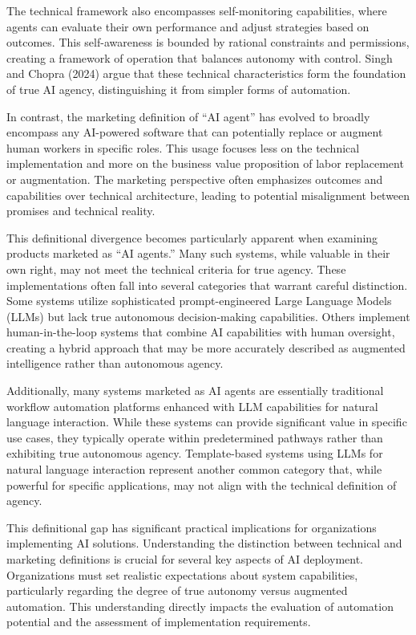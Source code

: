 \documentclass[
]{article}
\begin{document}
The technical framework also encompasses self-monitoring capabilities,
where agents can evaluate their own performance and adjust strategies
based on outcomes. This self-awareness is bounded by rational
constraints and permissions, creating a framework of operation that
balances autonomy with control. Singh and Chopra (2024) argue that these
technical characteristics form the foundation of true AI agency,
distinguishing it from simpler forms of automation.

In contrast, the marketing definition of ``AI agent'' has evolved to
broadly encompass any AI-powered software that can potentially replace
or augment human workers in specific roles. This usage focuses less on
the technical implementation and more on the business value proposition
of labor replacement or augmentation. The marketing perspective often
emphasizes outcomes and capabilities over technical architecture,
leading to potential misalignment between promises and technical
reality.

This definitional divergence becomes particularly apparent when
examining products marketed as ``AI agents.'' Many such systems, while
valuable in their own right, may not meet the technical criteria for
true agency. These implementations often fall into several categories
that warrant careful distinction. Some systems utilize sophisticated
prompt-engineered Large Language Models (LLMs) but lack true autonomous
decision-making capabilities. Others implement human-in-the-loop systems
that combine AI capabilities with human oversight, creating a hybrid
approach that may be more accurately described as augmented intelligence
rather than autonomous agency.

Additionally, many systems marketed as AI agents are essentially
traditional workflow automation platforms enhanced with LLM capabilities
for natural language interaction. While these systems can provide
significant value in specific use cases, they typically operate within
predetermined pathways rather than exhibiting true autonomous agency.
Template-based systems using LLMs for natural language interaction
represent another common category that, while powerful for specific
applications, may not align with the technical definition of agency.

This definitional gap has significant practical implications for
organizations implementing AI solutions. Understanding the distinction
between technical and marketing definitions is crucial for several key
aspects of AI deployment. Organizations must set realistic expectations
about system capabilities, particularly regarding the degree of true
autonomy versus augmented automation. This understanding directly
impacts the evaluation of automation potential and the assessment of
implementation requirements.
\end{document}
